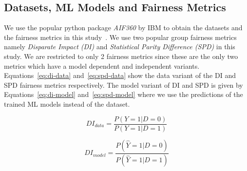 \documentclass{article}
\begin{document}



\subsection{Datasets, ML Models and Fairness Metrics}\label{sec:method-parameters}

We use the popular python package \emph{AIF360} by IBM to obtain the
datasets and the fairness metrics in this study \cite{aif360}. We use
two popular group fairness metrics namely \emph{Disparate Impact (DI)}
and \emph{Statistical Parity Difference (SPD)} in this study. We are
restricted to only 2 fairness metrics since these are the only two
metrics which have a model dependent and independent variants.
Equations \ref{eq:di-data} and \ref{eq:spd-data} show the data variant
of the DI and SPD fairness metrics respectively. The model variant of
DI and SPD is given by Equations \ref{eq:di-model}
and \ref{eq:spd-model} where we use the predictions of the trained ML
models instead of the dataset.

\begin{equation}
  DI_{data} = \frac{P(Y=1|D=0)}{P(Y=1|D=1)}
  \label{eq:di-data}
\end{equation}

\begin{equation}
  DI_{model} = \frac{P(\hat{Y}=1|D=0)}{P(\hat{Y}=1|D=1)}
  \label{eq:di-model}
\end{equation}
\end{document}
